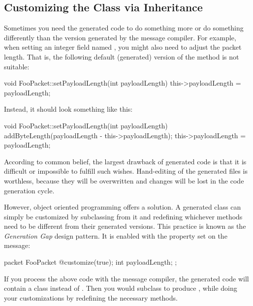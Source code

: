 

\subsection{Customizing the Class via Inheritance}
\label{sec:ch-msg-defs:customizing-via-inheritance}

Sometimes you need the generated code to do something
more or do something differently than the version generated
by the message compiler.
For example, when setting an integer field named ,
you might also need to adjust the packet length. That is,
the following default (generated) version of the
 method is not suitable:

\begin{cpp}
void FooPacket::setPayloadLength(int payloadLength)
{
    this->payloadLength = payloadLength;
}
\end{cpp}

Instead, it should look something like this:

\begin{cpp}
void FooPacket::setPayloadLength(int payloadLength)
{
    addByteLength(payloadLength - this->payloadLength);
    this->payloadLength = payloadLength;
}
\end{cpp}

According to common belief, the largest drawback of generated code
is that it is difficult or impossible to fulfill such wishes.
Hand-editing of the generated files is worthless, because
they will be overwritten and changes will be lost
in the code generation cycle.

However, object oriented programming offers a solution.
A generated class can simply be customized by subclassing
from it and redefining whichever methods need to be
different from their generated versions. This practice
is known as the \textit{Generation Gap} design pattern.
It is enabled with the  property set on the
message:

\begin{msg}
packet FooPacket
{
   @customize(true);
   int payloadLength;
};
\end{msg}

If you process the above code with the message compiler,
the generated code will contain a  class
instead of . Then you would subclass
 to produce ,
while doing your customizations by redefining the necessary methods.


